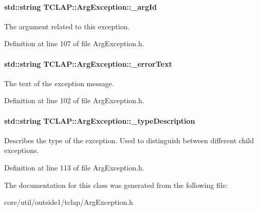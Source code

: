 \paragraph[{\texorpdfstring{\+\_\+arg\+Id}{_argId}}]{\setlength{\rightskip}{0pt plus 5cm}std\+::string T\+C\+L\+A\+P\+::\+Arg\+Exception\+::\+\_\+arg\+Id\hspace{0.3cm}{\ttfamily [private]}}\hypertarget{classTCLAP_1_1ArgException_a6bfa7ed4e5cc1404d6b4cc5d28cb1f28}{}\label{classTCLAP_1_1ArgException_a6bfa7ed4e5cc1404d6b4cc5d28cb1f28}
The argument related to this exception. 

Definition at line 107 of file Arg\+Exception.\+h.

\paragraph[{\texorpdfstring{\+\_\+error\+Text}{_errorText}}]{\setlength{\rightskip}{0pt plus 5cm}std\+::string T\+C\+L\+A\+P\+::\+Arg\+Exception\+::\+\_\+error\+Text\hspace{0.3cm}{\ttfamily [private]}}\hypertarget{classTCLAP_1_1ArgException_ad94d68e5948f6b74aacb8b2023e96c50}{}\label{classTCLAP_1_1ArgException_ad94d68e5948f6b74aacb8b2023e96c50}
The text of the exception message. 

Definition at line 102 of file Arg\+Exception.\+h.

\paragraph[{\texorpdfstring{\+\_\+type\+Description}{_typeDescription}}]{\setlength{\rightskip}{0pt plus 5cm}std\+::string T\+C\+L\+A\+P\+::\+Arg\+Exception\+::\+\_\+type\+Description\hspace{0.3cm}{\ttfamily [private]}}\hypertarget{classTCLAP_1_1ArgException_a7c69e599ae4a5b874a3e19cd4cf7c910}{}\label{classTCLAP_1_1ArgException_a7c69e599ae4a5b874a3e19cd4cf7c910}
Describes the type of the exception. Used to distinguish between different child exceptions. 

Definition at line 113 of file Arg\+Exception.\+h.



The documentation for this class was generated from the following file\+:\begin{DoxyCompactItemize}
\item 
core/util/outside1/tclap/Arg\+Exception.\+h\end{DoxyCompactItemize}
